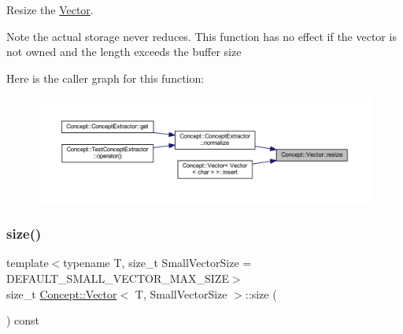 Resize the \mbox{\hyperlink{class_concept_1_1_vector}{Vector}}. \begin{DoxyNote}{Note}
the actual storage never reduces. This function has no effect if the vector is not owned and the length exceeds the buffer size 
\end{DoxyNote}
Here is the caller graph for this function\+:\nopagebreak
\begin{figure}[H]
\begin{center}
\leavevmode
\includegraphics[width=350pt]{class_concept_1_1_vector_afc564010d47219272ccc41a7536aa13f_icgraph}
\end{center}
\end{figure}
\mbox{\label{class_concept_1_1_vector_a8cffe973b29a8139f5b8c65409ad9f95}} 
\subsubsection{\texorpdfstring{size()}{size()}}
{\footnotesize\ttfamily template$<$typename T, size\+\_\+t Small\+Vector\+Size = D\+E\+F\+A\+U\+L\+T\+\_\+\+S\+M\+A\+L\+L\+\_\+\+V\+E\+C\+T\+O\+R\+\_\+\+M\+A\+X\+\_\+\+S\+I\+ZE$>$ \\
size\+\_\+t \mbox{\hyperlink{class_concept_1_1_vector}{Concept\+::\+Vector}}$<$ T, Small\+Vector\+Size $>$\+::size (\begin{DoxyParamCaption}{ }\end{DoxyParamCaption}) const\hspace{0.3cm}{\ttfamily [inline]}}

